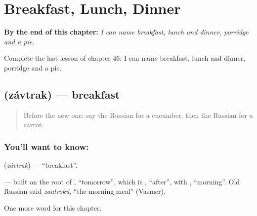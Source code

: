 
\chapter{Breakfast, Lunch, Dinner}
\label{ch:ru-breakfast-lunch-dinner}

\begin{chapteropening}
\textbf{By the end of this chapter:} \emph{I can name breakfast, lunch and dinner, porridge and a pie.}

Complete the last lesson of chapter 46: I can name breakfast, lunch and dinner, porridge and a pie.
\end{chapteropening}

\section[\texorpdfstring{\ru{завтрак} (závtrak)}{завтрак (závtrak)}]{ (závtrak) — breakfast}

\label{lesson:RU-C46-breakfast}



\begin{quote}
Before the new one: say the Russian for a cucumber, then the Russian for a carrot.
\end{quote}

\subsection*{You'll want to know: }
\textbf{} (\emph{závtrak}) — \textquotedblleft{}breakfast\textquotedblright{}.

\begin{cousinweb}
\textbf{} — built on the root of \emph{}, \textquotedblleft{}tomorrow\textquotedblright{}, which is \emph{}, \textquotedblleft{}after\textquotedblright{}, with \emph{}, \textquotedblleft{}morning\textquotedblright{}. Old Russian said \emph{zautrokŭ}, \textquotedblleft{}the morning meal\textquotedblright{} (Vasmer).
\end{cousinweb}

\begin{grammarlens}[title={What you've built}]
One more word for this chapter.
\end{grammarlens}

